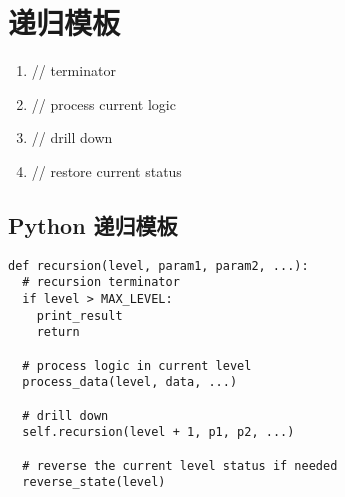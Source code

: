 \newpage
\section{递归模板}

\begin{enumerate}
  \item // terminator
  \item // process current logic
  \item // drill down
  \item // restore current status
\end{enumerate}

\subsection{Python 递归模板}

\begin{verbatim}
def recursion(level, param1, param2, ...):
  # recursion terminator
  if level > MAX_LEVEL:
    print_result
    return

  # process logic in current level
  process_data(level, data, ...)

  # drill down
  self.recursion(level + 1, p1, p2, ...)

  # reverse the current level status if needed
  reverse_state(level)
\end{verbatim}